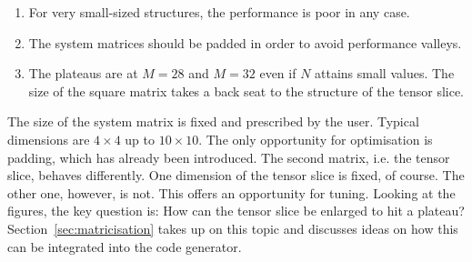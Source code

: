 \documentclass{acm_proc_article-sp}
\begin{document}
\begin{enumerate}
\item For very small-sized structures, the performance is poor in any case.
\item The system matrices should be padded in order to avoid performance valleys.
\item The plateaus are at $M=28$ and $M=32$ even if $N$ attains small values. The size of the square matrix takes a back seat to the structure of the tensor slice.
\end{enumerate}
The size of the system matrix is fixed and prescribed by the user. Typical dimensions are $4\times 4$ up to $10 \times 10$. The only opportunity for optimisation is padding, which has already been introduced. The second matrix, i.e. the tensor slice, behaves differently. One dimension of the tensor slice is fixed, of course. The other one, however, is not. This offers an opportunity for tuning. Looking at the figures, the key question is: How can the tensor slice be enlarged to hit a plateau? Section~\ref{sec:matricisation} takes up on this topic and discusses ideas on how this can be integrated into the code generator.
\end{document}
